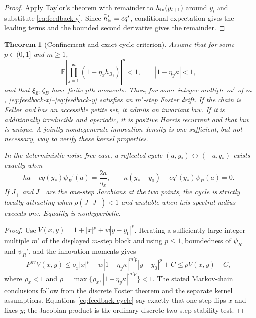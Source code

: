 \documentclass[10pt]{article}
\newtheorem{theorem}{Theorem}[section]
\theoremstyle{definition}
\theoremstyle{remark}
\newcommand{\E}{\mathbb E}
\begin{document}
\begin{proof}
Apply Taylor's theorem with remainder to $\bar h_{\rm in}(y_{t+1})$ around
$y_t$ and substitute \eqref{eq:feedback-y}.  Since
$\bar h_{\rm in}'=cq'$, conditional expectation gives the leading terms and
the bounded second derivative gives the remainder.
\end{proof}

\begin{theorem}[Confinement and exact cycle criterion]
\label{thm:feedback-confinement}
Assume that for some $p\in(0,1]$ and $m\ge1$,
\[
 \E\left|\prod_{j=1}^m(1-\eta_xh_{B_j})\right|^p<1,
 \qquad |1-\eta_y\kappa|<1,
\]
and that $\xi_B,\zeta_B$ have finite $p$th moments.  Then, for some integer
multiple $m'$ of $m$,
\eqref{eq:feedback-x}--\eqref{eq:feedback-y} satisfies an $m'$-step Foster
drift.  If the chain is Feller and has an accessible petite set, it admits an
invariant law.  If it is additionally irreducible and aperiodic, it is
positive Harris recurrent and that law is unique.  A jointly nondegenerate
innovation density is one sufficient, but not necessary, way to verify these
kernel properties.

In the deterministic noise-free case, a reflected cycle
$(a,y_*)\leftrightarrow(-a,y_*)$ exists exactly when
\begin{equation}
 h a+cq(y_*)\psi_R'(a)=\frac{2a}{\eta_x},
 \qquad
 \kappa(y_*-y_0)+cq'(y_*)\psi_R(a)=0.
 \label{eq:feedback-cycle}
\end{equation}
If $J_+$ and $J_-$ are the one-step Jacobians at the two points, the cycle is
strictly locally attracting when $\rho(J_-J_+)<1$ and unstable when this
spectral radius exceeds one.  Equality is nonhyperbolic.
\end{theorem}

\begin{proof}
Use $V(x,y)=1+|x|^p+w|y-y_0|^p$.  Iterating a sufficiently large integer
multiple $m'$ of the displayed $m$-step block and using $p\le1$, boundedness
of $\psi_R$ and $\psi_R'$, and the innovation moments gives
\[
 P^{m'}V(x,y)\le \rho_x|x|^p
 +w|1-\eta_y\kappa|^{m'p}|y-y_0|^p+C
 \le \rho V(x,y)+C,
\]
where $\rho_x<1$ and
$\rho=\max\{\rho_x,|1-\eta_y\kappa|^{m'p}\}<1$.
The stated Markov-chain conclusions follow from the discrete Foster theorem
and the separate kernel assumptions.  Equations
\eqref{eq:feedback-cycle} say exactly that one step flips $x$ and fixes $y$;
the Jacobian product is the ordinary discrete two-step stability test.
\end{proof}
\end{document}
